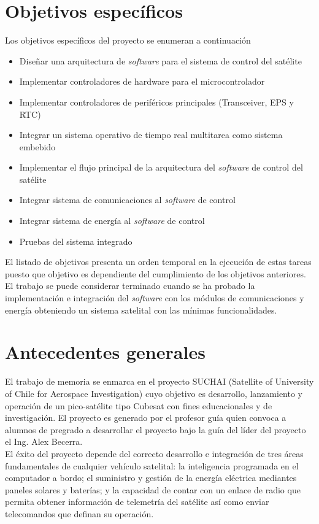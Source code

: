 \documentclass[11pt,letterpaper]{article}
\begin{document}
\section{Objetivos específicos}
Los objetivos específicos del proyecto se enumeran a continuación

\begin{itemize}
 \item Diseñar una arquitectura de \textit{software} para el sistema de control del satélite
 \item Implementar controladores de hardware para el microcontrolador
 \item Implementar controladores de periféricos principales (Transceiver, EPS y RTC)
 \item Integrar un sistema operativo de tiempo real multitarea como sistema embebido 
 \item Implementar el flujo principal de la arquitectura del \textit{software} de control del satélite
 \item Integrar sistema de comunicaciones al \textit{software} de control
 \item Integrar sistema de energía al \textit{software} de control
 \item Pruebas del sistema integrado
\end{itemize}

El listado de objetivos presenta un orden temporal en la ejecución de estas tareas puesto que objetivo es dependiente del cumplimiento de los objetivos anteriores. El trabajo se puede considerar terminado cuando se ha probado la implementación e integración del \textit{software} con los módulos de comunicaciones y energía obteniendo un sistema satelital con las mínimas funcionalidades.

\section{Antecedentes generales}

El trabajo de memoria se enmarca en el proyecto SUCHAI (Satellite of University of Chile for Aerospace Investigation) cuyo objetivo es desarrollo, lanzamiento y operación de un pico-satélite tipo Cubesat con fines educacionales y de investigación. El proyecto es generado por el profesor guía quien convoca a alumnos de pregrado a desarrollar el proyecto bajo la guía del líder del proyecto el Ing. Alex Becerra.\\

El éxito del proyecto depende del correcto desarrollo e integración de tres áreas fundamentales de cualquier vehículo satelital: la inteligencia programada en el computador a bordo; el suministro y gestión de la energía eléctrica mediantes paneles solares y baterías; y la capacidad de contar con un enlace de radio que permita obtener información de telemetría del satélite así como enviar telecomandos que definan su operación.\\
\end{document}
